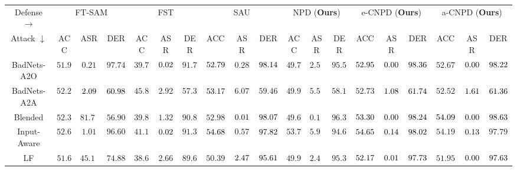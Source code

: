 \begin{table*}[t]
{\begin{tabular}{c|ccc|ccc|ccc|ccc|ccc|ccc}
\toprule
Defense $\rightarrow$ & \multicolumn{3}{c|}{FT-SAM \cite{zhu2023enhancing}} & \multicolumn{3}{c|}{FST \cite{min2024towards}} & \multicolumn{3}{c|}{SAU \cite{wei2023shared}} & \multicolumn{3}{c|}{NPD (\textbf{Ours})} & \multicolumn{3}{c|}{e-CNPD (\textbf{Ours})} & \multicolumn{3}{c}{a-CNPD (\textbf{Ours})} \\ 
Attack $\downarrow$ & \multicolumn{1}{c}{ACC} & \multicolumn{1}{c}{ASR} & \multicolumn{1}{c|}{DER} & \multicolumn{1}{c}{ACC} & \multicolumn{1}{c}{ASR} & \multicolumn{1}{c|}{DER} & \multicolumn{1}{c}{ACC} & \multicolumn{1}{c}{ASR} & \multicolumn{1}{c|}{DER} & \multicolumn{1}{c}{ACC} & \multicolumn{1}{c}{ASR} & \multicolumn{1}{c|}{DER} & \multicolumn{1}{c}{ACC} & \multicolumn{1}{c}{ASR} & \multicolumn{1}{c|}{DER} & \multicolumn{1}{c}{ACC} & \multicolumn{1}{c}{ASR} & \multicolumn{1}{c}{DER} \\ \midrule
BadNets-A2O \cite{gu2019badnets} & $51.91$& $0.21$& $97.74$& $39.73$& $\cellcolor[HTML]{D7E8F2}0.02$& $91.74$& $\cellcolor[HTML]{D7E8F2}52.79$& $0.28$& $\cellcolor[HTML]{D7E8F2}98.14$& $49.79$& $2.51$& $95.53$& $\cellcolor[HTML]{FEEBB8}52.95$& $\cellcolor[HTML]{FEEBB8}0.00$& $\cellcolor[HTML]{F1B9B6}98.36$& $52.67$& $\cellcolor[HTML]{F1B9B6}0.00$& $\cellcolor[HTML]{FEEBB8}98.22$\\
BadNets-A2A \cite{gu2019badnets} & $52.24$& $\cellcolor[HTML]{D7E8F2}2.09$& $\cellcolor[HTML]{D7E8F2}60.98$& $45.84$& $2.92$& $57.37$& $\cellcolor[HTML]{D7E8F2}53.17$& $6.07$& $59.46$& $49.94$& $5.57$& $58.10$& $52.73$& $\cellcolor[HTML]{F1B9B6}1.08$& $\cellcolor[HTML]{F1B9B6}61.74$& $52.52$& $\cellcolor[HTML]{FEEBB8}1.61$& $\cellcolor[HTML]{FEEBB8}61.36$\\
Blended \cite{chen2017targeted} & $52.36$& $81.74$& $56.90$& $39.84$& $1.32$& $90.85$& $52.98$& $\cellcolor[HTML]{D7E8F2}0.01$& $\cellcolor[HTML]{D7E8F2}98.07$& $49.62$& $0.12$& $96.34$& $\cellcolor[HTML]{D7E8F2}53.30$& $\cellcolor[HTML]{FEEBB8}0.00$& $\cellcolor[HTML]{FEEBB8}98.24$& $\cellcolor[HTML]{FEEBB8}54.09$& $\cellcolor[HTML]{F1B9B6}0.00$& $\cellcolor[HTML]{F1B9B6}98.63$\\
Input-Aware \cite{nguyen2020input} & $52.69$& $1.01$& $96.60$& $41.15$& $\cellcolor[HTML]{F1B9B6}0.02$& $91.32$& $\cellcolor[HTML]{FEEBB8}54.68$& $0.57$& $\cellcolor[HTML]{D7E8F2}97.82$& $53.75$& $5.93$& $94.67$& $\cellcolor[HTML]{D7E8F2}54.65$& $\cellcolor[HTML]{D7E8F2}0.14$& $\cellcolor[HTML]{FEEBB8}98.02$& $54.19$& $\cellcolor[HTML]{FEEBB8}0.13$& $97.79$\\
LF \cite{zeng2021rethinking} & $51.6$& $45.15$& $74.88$& $38.62$& $2.66$& $89.63$& $50.39$& $\cellcolor[HTML]{D7E8F2}2.47$& $\cellcolor[HTML]{D7E8F2}95.61$& $49.94$& $2.48$& $95.38$& $\cellcolor[HTML]{D7E8F2}52.17$& $\cellcolor[HTML]{FEEBB8}0.01$& $\cellcolor[HTML]{F1B9B6}97.73$& $51.95$& $\cellcolor[HTML]{F1B9B6}0.00$& $\cellcolor[HTML]{FEEBB8}97.63$\\

\end{tabular}}
\end{table*}
